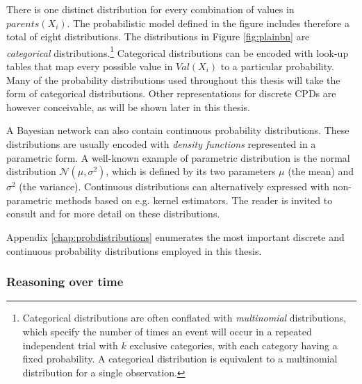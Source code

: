 
There is one distinct distribution for every combination of values in $parents(X_i)$. The probabilistic model defined in the figure includes therefore a total of eight distributions.  The distributions in Figure \ref{fig:plainbn} are \textit{categorical} distributions.\footnote{Categorical distributions are often conflated with \textit{multinomial} distributions, which specify the number of times an event will occur in a repeated independent trial with $k$ exclusive categories, with each category having a fixed probability.  A categorical distribution is equivalent to a multinomial distribution for a single observation.} Categorical distributions can be encoded with look-up tables that map every possible value in $Val(X_i)$ to a particular probability.  Many of the probability distributions used throughout this thesis will take the form of categorical distributions. Other representations for discrete CPDs are however conceivable, as will be shown later in this thesis.

A Bayesian network can also contain continuous probability distributions.  These distributions are usually encoded with \textit{density functions} represented in a parametric form.  A well-known example of parametric distribution is the normal distribution $\mathcal{N}(\mu,\sigma^2)$, which is defined by its two parameters $\mu$ (the mean) and $\sigma^2$ (the variance). Continuous distributions can alternatively expressed with non-parametric methods based on e.g. kernel estimators.  The reader is invited to consult  \cite{Bishop:2006} and \cite{Koller+Friedman:09} for more detail on these distributions. 

Appendix \ref{chap:probdistributions} enumerates the most important discrete and continuous probability distributions employed in this thesis.  %

\subsubsection*{Reasoning over time}

